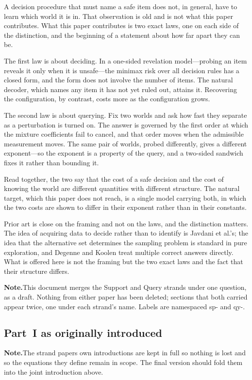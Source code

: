 \documentclass[conference]{IEEEtran}
\theoremstyle{definition}
\newif\ifshownotes\shownotestrue
\newcommand{\NOTEPAR}[1]{\ifshownotes\par\vspace{2pt}\noindent%
  {\color{notecol}\textsf{\footnotesize\textbf{Note.}\;#1}}\par\vspace{2pt}\fi}
\begin{document}
A decision procedure that must name a safe item does not, in general, have to learn which
world it is in. That observation is old and is not what this paper contributes. What this
paper contributes is two exact laws, one on each side of the distinction, and the beginning
of a statement about how far apart they can be.

The first law is about deciding. In a one-sided revelation model---probing an item reveals it
only when it is unsafe---the minimax risk over all decision rules has a closed form, and the
form does not involve the number of items. The natural decoder, which names any item it has
not yet ruled out, attains it. Recovering the configuration, by contrast, costs more as the
configuration grows.

The second law is about querying. Fix two worlds and ask how fast they separate as a
perturbation is turned on. The answer is governed by the first order at which the mixture
coefficients fail to cancel, and that order moves when the admissible measurement moves. The
same pair of worlds, probed differently, gives a different exponent---so the exponent is a
property of the query, and a two-sided sandwich fixes it rather than bounding it.

Read together, the two say that the cost of a safe decision and the cost of knowing the world
are different quantities with different structure. The natural target, which this paper does
not reach, is a single model carrying both, in which the two costs are shown to differ in
their exponent rather than in their constants.

Prior art is close on the framing and not on the laws, and the distinction matters. The idea
of acquiring data to decide rather than to identify is Javdani et al.'s; the idea that the
alternative set determines the sampling problem is standard in pure exploration, and Degenne
and Koolen treat multiple correct answers directly. What is offered here is not the framing
but the two exact laws and the fact that their structure differs.

\NOTEPAR{This document merges the Support and Query strands under one question, as a draft.
Nothing from either paper has been deleted; sections that both carried appear twice, one under
each strand's name. Labels are namespaced \textsf{sp-} and \textsf{qy-}.}

\subsection{Part~I as originally introduced}
\NOTEPAR{The strand papers own introductions are kept in full so nothing is lost and so the equations they define remain in scope. The final version should fold them into the joint introduction above.}
\end{document}
